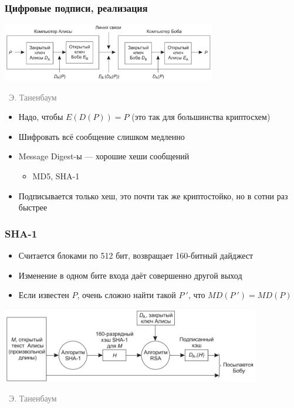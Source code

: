 \documentclass[xetex,mathserif,serif]{beamer}
\newcommand{\attribution}[1] {
\vspace{-5mm}\begin{flushright}\begin{scriptsize}\textcolor{gray}{\textcopyright\, #1}\end{scriptsize}\end{flushright}
}
\begin{document}
    \begin{frame}
        \frametitle{Цифровые подписи, реализация}
        \begin{center}
            \includegraphics[width=0.7\textwidth]{signature.png}
            \attribution{Э. Таненбаум}
        \end{center}
        \begin{itemize}
            \item Надо, чтобы $E(D(P)) = P$ (это так для большинства криптосхем)
            \item Шифровать всё сообщение слишком медленно
            \item Message Digest-ы --- хорошие хеши сообщений
            \begin{itemize}
                \item MD5, SHA-1
            \end{itemize}
            \item Подписывается только хеш, это почти так же криптостойко, но в сотни раз быстрее
        \end{itemize}
    \end{frame}

    \begin{frame}
        \frametitle{SHA-1}
        \begin{itemize}
            \item Считается блоками по 512 бит, возвращает 160-битный дайджест
            \item Изменение в одном бите входа даёт совершенно другой выход
            \item Если известен $P$, очень сложно найти такой $P\ '$, что $MD(P\ ') = MD(P)$
        \end{itemize}
        \begin{center}
            \includegraphics[width=0.85\textwidth]{sha1Signature.png}
            \attribution{Э. Таненбаум}
        \end{center}
    \end{frame}
\end{document}

